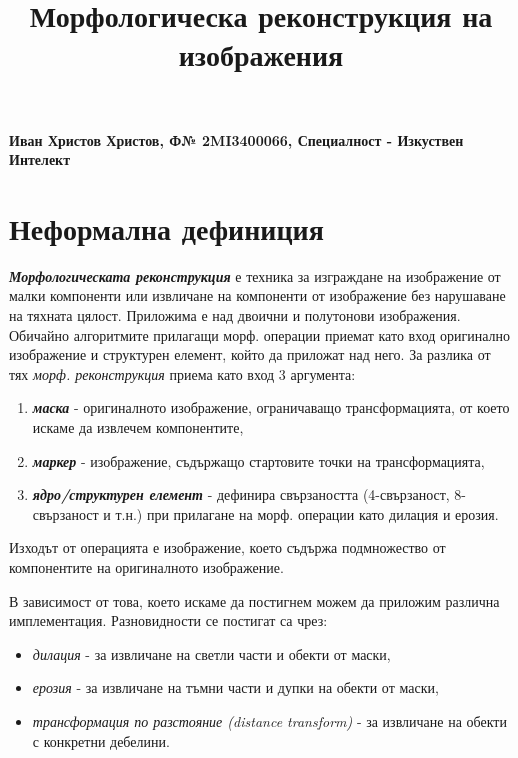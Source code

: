 \documentclass[fleqn,12pt]{article}
\title{Морфологическа реконструкция на изображения}
\begin{document}
\maketitle
\begin{center}
\textbf{Иван Христов Христов, Ф№ 2MI3400066, Специалност - Изкуствен Интелект}

\tableofcontents

\end{center}

\section{Неформална дефиниция}

\textbf{\textit{Морфологическата реконструкция}} е техника за изграждане на изображение от малки компоненти или извличане на компоненти от изображение без нарушаване на тяхната цялост. Приложима е над двоични и полутонови изображения. Обичайно алгоритмите прилагащи морф. операции приемат като вход оригинално изображение и структурен елемент, който да приложат над него. За разлика от тях \textit{морф. реконструкция} приема като вход 3 аргумента:
\begin{enumerate}
    \item \textit{\textbf{маска}} - оригиналното изображение, ограничаващо трансформацията, от което искаме да извлечем компонентите,
    \item \textit{\textbf{маркер}} - изображение, съдържащо стартовите точки на трансформацията,
    \item \textit{\textbf{ядро/структурен елемент}} - дефинира свързаността (4-свързаност, 8-свързаност и т.н.) при прилагане на морф. операции като дилация и ерозия.
\end{enumerate}

Изходът от операцията е изображение, което съдържа подмножество от компонентите на оригиналното изображение.

\bigbreak

В зависимост от това, което искаме да постигнем можем да приложим различна имплементация. Разновидности се постигат са чрез:
\begin{itemize}
    \item \textit{дилация} - за извличане на светли части и обекти от маски,
    \item \textit{ерозия} - за извличане на тъмни части и дупки на обекти от маски,
    \item \textit{трансформация по разстояние (distance transform)} - за извличане на обекти с конкретни дебелини.
\end{itemize}
\end{document}
